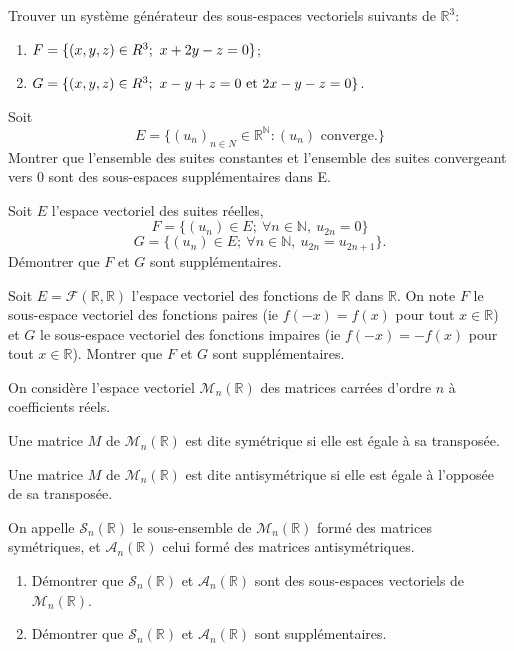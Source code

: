 \documentclass{book}
\begin{document}
\begin{Exercice}
Trouver un système générateur des sous-espaces vectoriels suivants de $\mathbb R^3$:
\begin{enumerate}
\item $F=\{(x,y,z)\in\mathbb \mathbb R^3;\ x+2y-z=0\}$;
\item $G=\{(x,y,z)\in\mathbb \mathbb R^3;\ x-y+z=0\textrm{ et }2x-y-z=0\}$.
\end{enumerate}
\end{Exercice}
\begin{Exercice}
Soit
$$E = \{(u_n)_{n\in N} \in  \mathbb R^\mathbb N : (u_n)\text{ converge}.\}$$
Montrer que l'ensemble des suites constantes et l'ensemble des suites convergeant vers 0 sont des sous-espaces supplémentaires dans E.
\end{Exercice}

\begin{Exercice}
Soit $E$ l'espace vectoriel des suites réelles, 
$$F=\{(u_n)\in E;\ \forall n\in\mathbb N,\ u_{2n}=0\}$$
$$G=\{(u_n)\in E;\ \forall n\in\mathbb N,\ u_{2n}=u_{2n+1}\}.$$
Démontrer que $F$ et $G$ sont supplémentaires.
\end{Exercice}

\begin{Exercice}
Soit $E=\mathcal F(\mathbb R,\mathbb R)$ l'espace vectoriel des fonctions de $\mathbb R$ dans $\mathbb R$.
On note $F$ le sous-espace vectoriel des fonctions paires (ie $f(-x)=f(x)$ pour tout $x\in\mathbb R$)
et $G$ le sous-espace vectoriel des fonctions impaires (ie $f(-x)=-f(x)$ pour tout $x\in\mathbb R$).
Montrer que $F$ et $G$ sont supplémentaires.
\end{Exercice}
\begin{Exercice}
On considère l'espace vectoriel $\mathcal{M}_n(\mathbb R)$ des matrices carrées d'ordre $n$   à coefficients réels.

Une matrice $M$  de  $\mathcal{M}_n(\mathbb R)$ est dite symétrique si elle est égale à sa transposée.

Une matrice  $M$ de $\mathcal{M}_n(\mathbb R)$  est dite antisymétrique si elle est égale à l'opposée de sa transposée.

On appelle $\mathcal{S}_n(\mathbb R)$  le sous-ensemble de $\mathcal{M}_n(\mathbb R)$  formé des matrices symétriques, et $\mathcal{A}_n(\mathbb R)$  celui formé des matrices antisymétriques.
\begin{enumerate}
\item Démontrer que $\mathcal{S}_n(\mathbb R)$  et  $\mathcal{A}_n(\mathbb R)$ sont des sous-espaces vectoriels de   $\mathcal{M}_n(\mathbb R)$.
\item Démontrer que $\mathcal{S}_n(\mathbb R)$  et  $\mathcal{A}_n(\mathbb R)$ sont supplémentaires.
\end{enumerate}
\end{Exercice}
\end{document}
